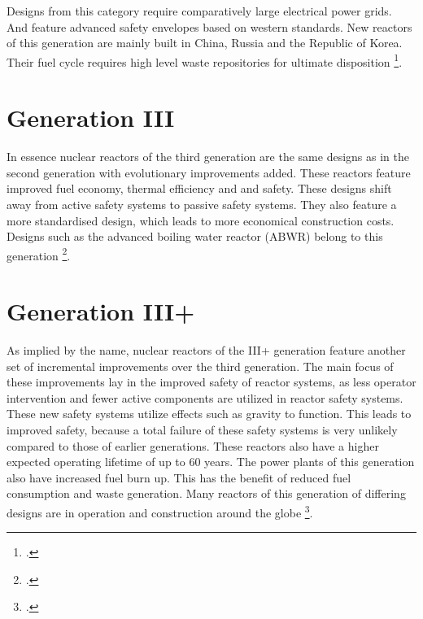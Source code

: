 Designs from this category require comparatively large electrical power grids. And feature advanced
safety envelopes based on western standards. New reactors of this generation are mainly built in
China, Russia and the Republic of Korea. Their fuel cycle requires high level waste repositories
for ultimate disposition \footcite[4-6]{Gen2gen}.
\section{Generation III}
In essence nuclear reactors of the third generation are the same designs as in the second generation
with evolutionary improvements added. These reactors feature improved fuel economy, thermal efficiency and
and safety. These designs shift away from active safety systems to passive safety systems. They also
feature a more standardised design, which leads to more economical construction costs. Designs such
as the advanced boiling water reactor (ABWR) belong to this generation \footcite[5,6]{Gen2gen}.
\section{Generation III+}
As implied by the name, nuclear reactors of the III+ generation feature another set of incremental improvements over the third
generation. The main focus of these improvements lay in the improved safety of reactor systems, as
less operator intervention and fewer active components are utilized in reactor safety systems. These
new safety systems utilize effects such as gravity to function. This leads to improved safety, because a
total failure of these safety systems is very unlikely compared to those of earlier generations.
These reactors also have a higher expected operating lifetime of up to 60 years. The power plants of
this generation also have increased fuel burn up. This has the benefit of reduced fuel consumption
and waste generation. Many reactors of this generation of differing designs are in operation
and construction around the globe \footcite[7-11]{Gen2gen}.